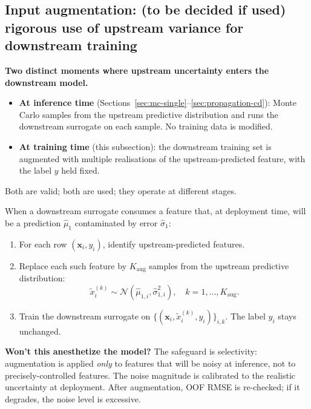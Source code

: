 \documentclass[11pt,a4paper]{article}
\begin{document}
\subsection{Input augmentation: (to be decided if used) rigorous use of upstream variance for downstream training}
\label{sec:input-aug}

\begin{recapbox}
\textbf{Two distinct moments where upstream uncertainty enters the downstream model.}
\begin{itemize}
    \item \textbf{At inference time} (Sections~\ref{sec:mc-single}--\ref{sec:propagation-cd}): Monte Carlo samples from the upstream predictive distribution and runs the downstream surrogate on each sample. No training data is modified.
    \item \textbf{At training time} (this subsection): the downstream training set is augmented with multiple realisations of the upstream-predicted feature, with the label $y$ held fixed.
\end{itemize}
Both are valid; both are used; they operate at different stages.
\end{recapbox}

When a downstream surrogate consumes a feature that, at deployment time, will be a prediction $\hat\mu_1$ contaminated by error $\hat\sigma_1$:
\begin{enumerate}
    \item For each row $(\bm x_i, y_i)$, identify upstream-predicted features.
    \item Replace each such feature by $K_{\text{aug}}$ samples from the upstream predictive distribution:
    \[
    \tilde x_i^{(k)} \sim \mathcal{N}(\hat\mu_{1, i}, \hat\sigma^2_{1, i}), \quad k = 1, \ldots, K_{\text{aug}}.
    \]
    \item Train the downstream surrogate on $\{(\bm x_i, \tilde x_i^{(k)}, y_i)\}_{i,k}$. The label $y_i$ stays unchanged.
\end{enumerate}

\begin{intuitionbox}
\textbf{Won't this anesthetize the model?} The safeguard is selectivity: augmentation is applied \emph{only} to features that will be noisy at inference, not to precisely-controlled features. The noise magnitude is calibrated to the realistic uncertainty at deployment. After augmentation, OOF RMSE is re-checked; if it degrades, the noise level is excessive.
\end{intuitionbox}
\end{document}
